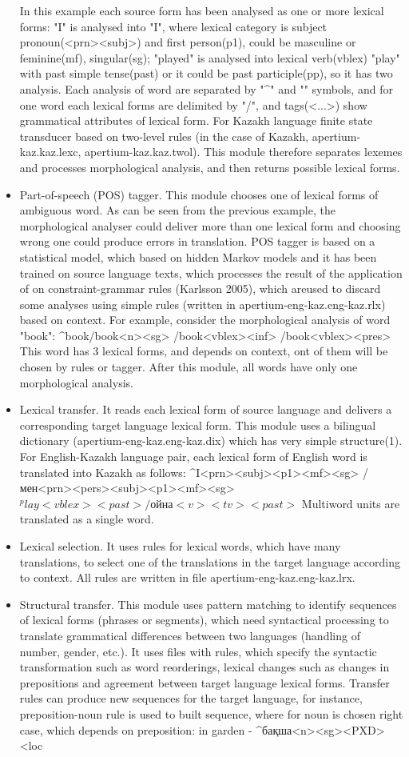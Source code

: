 \documentclass[11pt]{article}
\begin{document}
\begin{itemize}
In this example each source form has been analysed as one or more lexical forms: "I" is analysed into "I", where lexical category is subject pronoun(<prn><subj>) and first person(p1), could be masculine or feminine(mf), singular(sg); "played" is analysed into lexical verb(vblex) "play" with past simple tense(past) or it could be past participle(pp), so it has two analysis. Each analysis of word are separated by "^" and "" symbols, and for one word each lexical forms are delimited by "/", and tags(<...>) show grammatical attributes of lexical form. 
 For Kazakh language finite state transducer based on two-level rules (in the case of Kazakh, apertium-kaz.kaz.lexc, apertium-kaz.kaz.twol). This module therefore separates lexemes and processes morphological analysis, and then returns possible lexical forms.
\item	Part-of-speech (POS) tagger. This module chooses one of lexical forms of ambiguous word. As can be seen from the previous example, the morphological analyser could deliver more than one lexical form and choosing wrong one could produce errors in translation. POS tagger is based on a statistical model, which based on hidden Markov models and it has been trained on source language texts, which processes the result of the application of  on constraint-grammar rules (Karlsson 2005), which areused to discard some analyses  using simple rules (written in apertium-eng-kaz.eng-kaz.rlx) based on context. For example, consider the morphological analysis of word "book":
^book/book<n><sg>
/book<vblex><inf>
/book<vblex><pres>
This word has 3 lexical forms, and depends on context, ont of them will be chosen by rules or tagger. After  this module, all words have only one morphological analysis.
\item	Lexical transfer. It reads each lexical form of source language and delivers a corresponding target language lexical form. This module uses a bilingual dictionary (apertium-eng-kaz.eng-kaz.dix) which has very simple structure(1). For English-Kazakh language pair, each lexical form of English word is translated into Kazakh as follows:
^I<prn><subj><p1><mf><sg> /мен<prn><pers><subj><p1><mf><sg>$ 
^play<vblex><past>/ойна<v><tv><past>$
 Multiword units are translated as a single word.
\item Lexical selection. It uses rules for lexical words, which have many translations, to select one of the translations in the target language according to context. All rules are written in file apertium-eng-kaz.eng-kaz.lrx.
\item Structural transfer. This module uses pattern matching to identify sequences of lexical forms  (phrases or segments), which need syntactical processing to translate grammatical differences between two languages (handling of number, gender, etc.). It uses  files with rules, which specify  the syntactic transformation such as word reorderings, lexical changes such as changes in prepositions and agreement between target language lexical forms. Transfer rules can produce new sequences for the  target language, for instance, preposition-noun rule is used to built sequence, where for noun is chosen right case, which depends on preposition: 
in garden  -  ^бақша<n><sg><PXD><loc
  

\end{itemize}
\end{document}
